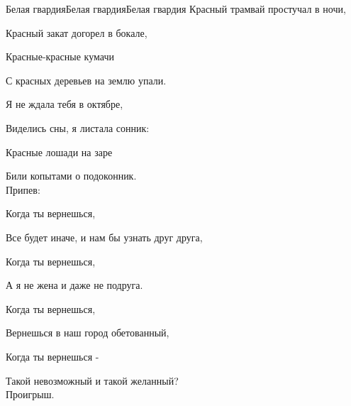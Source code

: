 \documentclass[11pt,a5paper]{book}
\begin{document}
\begin{song}{Белая гвардия}{}{Белая гвардия}{Белая гвардия}{}{}
Красный трамвай простучал в ночи,\par
Красный закат догорел в бокале,\par
Красные-красные кумачи\par
С красных деревьев на землю упали.\par
Я не ждала тебя в октябре,\par
Виделись сны, я листала сонник:\par
Красные лошади на заре\par
Били копытами о подоконник.\\

Припев:\par
Когда ты вернешься,\par
Все будет иначе, и нам бы узнать друг друга,\par
Когда ты вернешься,\par
А я не жена и даже не подруга.\par
Когда ты вернешься,\par
Вернешься в наш город обетованный,\par
Когда ты вернешься -\par
Такой невозможный и такой желанный?\\

Проигрыш.\par

\end{song}
\end{document}
